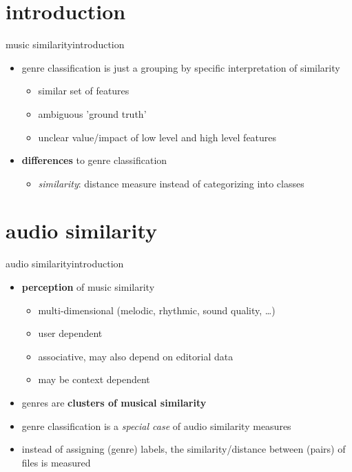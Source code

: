     \section[intro]{introduction}
        \begin{frame}{music similarity}{introduction}
            \begin{itemize}
                \item	genre classification is just a grouping by specific interpretation of similarity
                    \begin{itemize}
                        \item	similar set of features
                        \item	ambiguous 'ground truth'
                        \item   unclear value/impact of low level and high level features
                    \end{itemize}
                \bigskip
                \item<2->	 \textbf{differences} to genre classification
                    \begin{itemize}
                        \item	\textit{similarity}: distance measure instead of categorizing into classes
                    \end{itemize}
            \end{itemize}
        \end{frame}


    \section[similarity]{audio similarity}
        \begin{frame}{audio similarity}{introduction}
            \begin{itemize}
                \item   \textbf{perception} of music similarity
                    \begin{itemize}
                        \item	multi-dimensional (melodic, rhythmic, sound quality, \ldots)
                        \item	user dependent
                        \item	associative, may also depend on editorial data
                        \item	may be context dependent
                    \end{itemize}
                \bigskip
                \item<2->   genres are \textbf{clusters of musical similarity}
                \item<2->[$\Rightarrow$]	genre classification is a \textit{special case} of audio similarity measures
                \item<3->	instead of assigning (genre) labels, the similarity/distance between (pairs) of files is measured
            \end{itemize}
        \end{frame}
